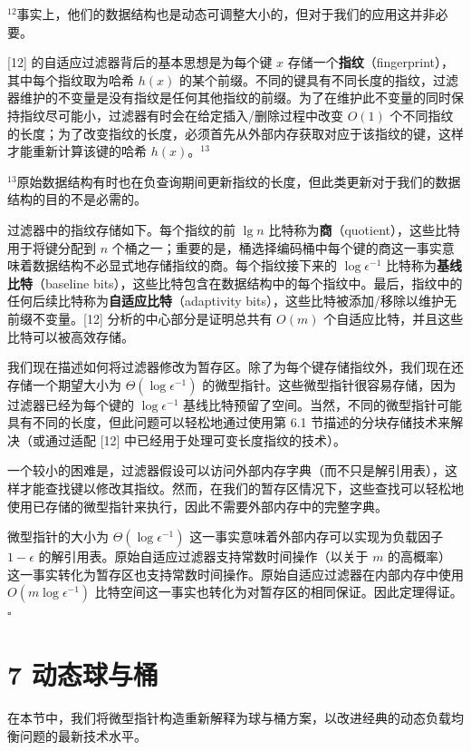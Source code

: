 \documentclass[12pt,a4paper]{ctexart}
\theoremstyle{remark}
\begin{document}
$^{12}$事实上，他们的数据结构也是动态可调整大小的，但对于我们的应用这并非必要。

[12] 的自适应过滤器背后的基本思想是为每个键 $x$ 存储一个\textbf{指纹}（fingerprint），其中每个指纹取为哈希 $h(x)$ 的某个前缀。不同的键具有不同长度的指纹，过滤器维护的不变量是没有指纹是任何其他指纹的前缀。为了在维护此不变量的同时保持指纹尽可能小，过滤器有时会在给定插入/删除过程中改变 $O(1)$ 个不同指纹的长度；为了改变指纹的长度，必须首先从外部内存获取对应于该指纹的键，这样才能重新计算该键的哈希 $h(x)$。$^{13}$

$^{13}$原始数据结构有时也在负查询期间更新指纹的长度，但此类更新对于我们的数据结构的目的不是必需的。

过滤器中的指纹存储如下。每个指纹的前 $\lg n$ 比特称为\textbf{商}（quotient），这些比特用于将键分配到 $n$ 个桶之一；重要的是，桶选择编码桶中每个键的商这一事实意味着数据结构不必显式地存储指纹的商。每个指纹接下来的 $\log\epsilon^{-1}$ 比特称为\textbf{基线比特}（baseline bits），这些比特包含在数据结构中的每个指纹中。最后，指纹中的任何后续比特称为\textbf{自适应比特}（adaptivity bits），这些比特被添加/移除以维护无前缀不变量。[12] 分析的中心部分是证明总共有 $O(m)$ 个自适应比特，并且这些比特可以被高效存储。

我们现在描述如何将过滤器修改为暂存区。除了为每个键存储指纹外，我们现在还存储一个期望大小为 $\Theta(\log\epsilon^{-1})$ 的微型指针。这些微型指针很容易存储，因为过滤器已经为每个键的 $\log\epsilon^{-1}$ 基线比特预留了空间。当然，不同的微型指针可能具有不同的长度，但此问题可以轻松地通过使用第 6.1 节描述的分块存储技术来解决（或通过适配 [12] 中已经用于处理可变长度指纹的技术）。

一个较小的困难是，过滤器假设可以访问外部内存字典（而不只是解引用表），这样才能查找键以修改其指纹。然而，在我们的暂存区情况下，这些查找可以轻松地使用已存储的微型指针来执行，因此不需要外部内存中的完整字典。

微型指针的大小为 $\Theta(\log\epsilon^{-1})$ 这一事实意味着外部内存可以实现为负载因子 $1-\epsilon$ 的解引用表。原始自适应过滤器支持常数时间操作（以关于 $m$ 的高概率）这一事实转化为暂存区也支持常数时间操作。原始自适应过滤器在内部内存中使用 $O(m\log\epsilon^{-1})$ 比特空间这一事实也转化为对暂存区的相同保证。因此定理得证。$\square$

\medskip
\section{7 动态球与桶}
在本节中，我们将微型指针构造重新解释为球与桶方案，以改进经典的动态负载均衡问题的最新技术水平。
\end{document}
